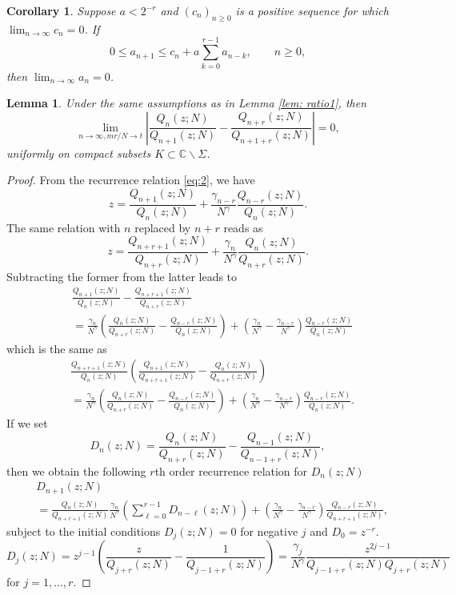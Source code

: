 \documentclass[10pt,a4paper]{amsart}
\newtheorem{lemma}{Lemma}
\newtheorem{corollary}{Corollary}
\begin{document}
\begin{corollary}\label{cor:aux1}
Suppose $a < 2^{-r}$ and $(c_n)_{n \geq 0}$ is a positive sequence for which $\lim_{n \to \infty} c_n = 0$. If
\[    0 \leq  a_{n+1} \leq c_n + a \sum_{k=0}^{r-1} a_{n-k}, \qquad  n \geq 0,  \]
then $\lim_{n \to \infty} a_n= 0$.  
\end{corollary}

\begin{lemma}\label{lemma independence of limits} Under the same assumptions as in Lemma \ref{lem: ratio1}, then  
\[ 
	\lim_{n\to \infty, mr/N \to t}\left| \frac{Q_{n}(z;N)}{Q_{n+1}(z;N)} - \frac{Q_{n+r}(z;N)}{Q_{n+1+r}(z;N)} \right| = 0, 
\] 
uniformly on compact subsets $K\subset \mathbb{C} \backslash \Sigma$.
\end{lemma}

\begin{proof}%
From the recurrence relation \eqref{eq:2}, we have 
\[
	z = \frac{Q_{n+1}(z;N)}{Q_{n}(z;N)} 
		+ \frac{\gamma_{n-r}}{N^\gamma} \frac{Q_{n-r}(z;N)}{Q_{n}(z;N)} . 
\]
The same relation with $n$ replaced by $n+r$ reads as 
\[
	z = \frac{Q_{n+r+1}(z;N)}{Q_{n+r}(z;N)} 
		+ \frac{\gamma_{n}}{N^\gamma} \frac{Q_{n}(z;N)}{Q_{n+r}(z;N)} . 
\]
Subtracting the former from the latter leads to
\begin{align*}
&	 \frac{Q_{n+1}(z;N)}{Q_{n}(z;N)}  - \frac{Q_{n+r+1}(z;N)}{Q_{n+r}(z;N)} \\
&	 =  \frac{\gamma_{n}}{N^\gamma} \left(  \frac{Q_{n}(z;N)}{Q_{n+r}(z;N)} - \frac{Q_{n-r}(z;N)}{Q_{n}(z;N)}\right) 
	 + \left(   \frac{\gamma_{n}}{N^\gamma} - \frac{\gamma_{n-r}}{N^\gamma}  \right) \frac{Q_{n-r}(z;N)}{Q_{n}(z;N)}
\end{align*}
which is the same as 
\begin{align*}
	& \frac{Q_{n+r+1}(z;N)}{Q_{n}(z;N)} \left( \frac{Q_{n+1}(z;N)}{Q_{n+r+1}(z;N)}  -   \frac{Q_{n}(z;N)}{Q_{n+r}(z;N)}  \right) \\
	 &  = \frac{\gamma_{n}}{N^\gamma} \left(  \frac{Q_{n}(z;N)}{Q_{n+r}(z;N)} - \frac{Q_{n-r}(z;N)}{Q_{n}(z;N)}\right) 
	 + \left(   \frac{\gamma_{n}}{N^\gamma} - \frac{\gamma_{n-r}}{N^\gamma}  \right) \frac{Q_{n-r}(z;N)}{Q_{n}(z;N)}. 
\end{align*}
If we set 
\[
	D_{n}(z;N) = \frac{Q_{n}(z;N)}{Q_{n+r}(z;N)}  -   \frac{Q_{n-1}(z;N)}{Q_{n-1+r}(z;N)} , 
\]
then we obtain the following $r$th order recurrence relation for $D_n(z;N)$
\begin{align*}
	&D_{n+1} (z;N)\\
	 &  =   \frac{Q_{n}(z;N)}{Q_{n+r+1}(z;N)}\frac{\gamma_{n}}{N^\gamma} \left(  \sum_{\ell = 0}^{r-1} D_{n-\ell} (z;N) \right) 
	 + \left(   \frac{\gamma_{n}}{N^\gamma} - \frac{\gamma_{n-r}}{N^\gamma}  \right) \frac{Q_{n-r}(z;N)}{Q_{n+r+1}(z;N)}, 
\end{align*}
subject to the initial conditions $D_j(z;N)=0$ for negative $j$ and $D_0=z^{-r}$.
\[ D_j(z;N) = z^{j-1}  \left( \frac{z}{Q_{j+r}(z;N)}  -   \frac{1}{Q_{j-1+r}(z;N)}\right) = \frac{\gamma_j }{N^\gamma }\frac{z^{2j-1}}{Q_{j-1+r}(z;N)Q_{j+r}(z;N)}  \]
 for $j=1,\ldots , r$. 


\end{proof}
\end{document}
